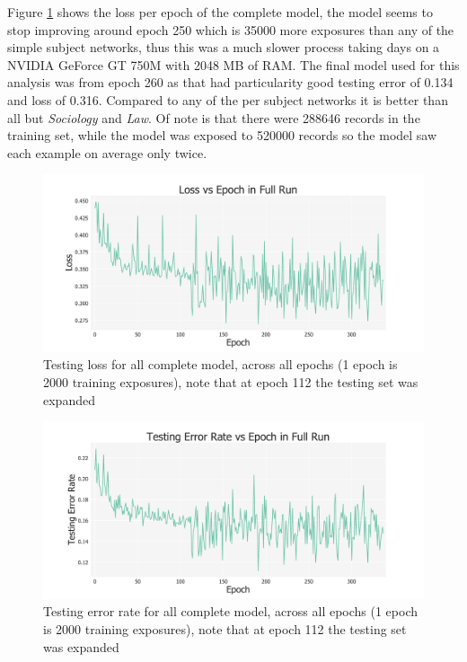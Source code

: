 \documentclass[12pt, a4paper]{article}
\begin{document}
Figure \ref{full_loss} shows the loss per epoch of the complete model, the model seems to stop improving around epoch 250 which is \num{35000} more exposures than any of the simple subject networks, thus this was a much slower process taking days on a NVIDIA GeForce GT 750M with \num{2048} MB of RAM. The final model used for this analysis was from epoch 260 as that had particularity good testing error of \num{0.134} and loss of \num{0.316}. Compared to any of the per subject networks it is better than all but \textit{Sociology} and \textit{Law}. Of note is that there were \num{288646} records in the training set, while the model was exposed to \num{520000} records so the model saw each example on average only twice.


\begin{figure}[H]
	\centering
	\begin{adjustbox}{center}
		\includegraphics[width=1.3\textwidth]{full_loss}
	\end{adjustbox}
	\caption{Testing loss for all complete  model, across all epochs (1 epoch is 2000 training exposures), note that at epoch 112 the testing set was expanded}\label{full_loss}
\end{figure}

\begin{figure}[H]
	\centering
	\begin{adjustbox}{center}
		\includegraphics[width=1.3\textwidth]{full_testing_error_rate}
	\end{adjustbox}
	\caption{Testing error rate for all complete  model, across all epochs (1 epoch is 2000 training exposures), note that at epoch 112 the testing set was expanded}\label{full_testing_error_rate}
\end{figure}
\end{document}
